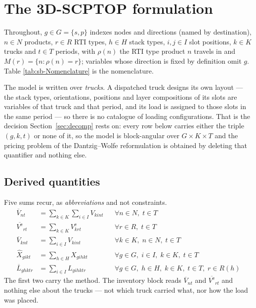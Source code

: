 \section{The 3D-SCPTOP formulation}
\label{sec:model}

Throughout, $g\in G=\{s,p\}$ indexes nodes and directions (named by
destination), $n\in N$ products, $r\in R$ RTI types, $h\in H$ stack
types, $i,j\in I$ slot positions, $k\in K$ trucks and $t\in T$ periods,
with $\rho(n)$ the RTI type product $n$ travels in and
$M(r)=\{n:\rho(n)=r\}$; variables whose direction is fixed by
definition omit $g$. Table \ref{tab:sb-Nomenclature} is the
nomenclature.

The model is written over \emph{trucks}. A dispatched truck designs its
own layout --- the stack types, orientations, positions and layer
compositions of its slots are variables of that truck and that period,
and its load is assigned to those slots in the same period --- so there
is no catalogue of loading configurations. That is the decision
Section~\ref{sec:decomp} rests on: every row below carries either the
triple $(g,k,t)$ or none of it, so the model is block-angular over
$G\times K\times T$ and the pricing problem of the Dantzig--Wolfe
reformulation is obtained by deleting that quantifier and nothing
else.



\subsection{Derived quantities}

Five sums recur, as \emph{abbreviations} and not constraints.
\begin{align}
\overline{V}_{nt}&=\sum_{k\in K}\sum_{i\in I} V_{kint}
    &&\forall n\in N,\; t\in T
    \label{sb:eq:agg-V}\\
\overline{V^{\mathrm{e}}}_{rt}&=\sum_{k\in K} V^{\mathrm{e}}_{krt}
    &&\forall r\in R,\; t\in T
    \label{sb:eq:agg-Ve}\\
\overline{V}_{knt}&=\sum_{i\in I} V_{kint}
    &&\forall k\in K,\; n\in N,\; t\in T
    \label{sb:eq:agg-Vk}\\
\widehat{X}_{gikt}&=\sum_{h\in H} X_{gihkt}
    &&\forall g\in G,\; i\in I,\; k\in K,\; t\in T
    \label{sb:eq:agg-X}\\
\overline{L}_{ghktr}&=\sum_{i\in I} L_{gihktr}
    &&\forall g\in G,\; h\in H,\; k\in K,\; t\in T,\; r\in R(h)
    \label{sb:eq:agg-L}
\end{align}
The first two carry the method. The inventory block reads
$\overline{V}_{nt}$ and $\overline{V^{\mathrm{e}}}_{rt}$ and nothing
else about the trucks --- not which truck carried what, nor how the
load was placed.

